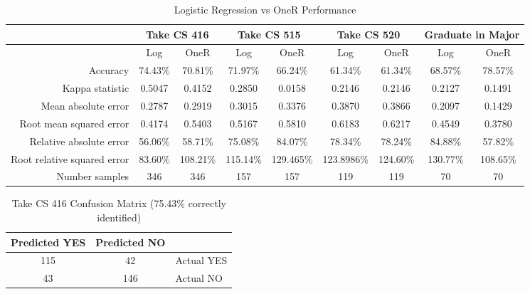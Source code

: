 \documentclass[letterpaper,11pt]{article}
\begin{document}
\begin{table}[h!]
\begin{center}
\tiny
  \begin{tabular}{r|c|c|c|c|c|c|c|c|}
          & \multicolumn{2}{|c|}{Take CS 416}& \multicolumn{2}{|c|}{Take CS 515}& \multicolumn{2}{|c|}{Take CS 520}& \multicolumn{2}{|c|}{Graduate in Major} \\ \hline
                              & Log     & OneR    & Log     & OneR      & Log        & OneR     & Log        & OneR\\ \hline
Accuracy                      & 74.43\% & 70.81\% & 71.97\% & 66.24\%   & 61.34\%    & 61.34\%  & 68.57\%    & 78.57\% \\
Kappa statistic               & 0.5047  & 0.4152  & 0.2850  & 0.0158    & 0.2146     & 0.2146   & 0.2127     & 0.1491 \\
Mean absolute error           & 0.2787  & 0.2919  & 0.3015  & 0.3376    & 0.3870     & 0.3866   & 0.2097     & 0.1429 \\
Root mean squared error       & 0.4174  & 0.5403  & 0.5167  & 0.5810    & 0.6183     & 0.6217   & 0.4549     & 0.3780 \\
Relative absolute error       & 56.06\% & 58.71\% & 75.08\% & 84.07\%   & 78.34\%    & 78.24\%  & 84.88\%    & 57.82\% \\
Root relative squared error   & 83.60\% & 108.21\%& 115.14\%& 129.465\% & 123.8986\% & 124.60\% & 130.77\%   & 108.65\% \\
Number samples                & 346     & 346     & 157     & 157       & 119        & 119      & 70         & 70 \\
  \end{tabular}
\end{center}
  \caption {Logistic Regression vs OneR Performance}
\label{table:logperform}
\end{table}

\begin{table}[h!]
\begin{center}
  \begin{tabular}{ c | c | l }
Predicted YES & Predicted NO & \\ \hline
115  & 42   & Actual YES \\
43   & 146  & Actual NO \\
  \end{tabular}
\end{center}
  \caption {Take CS 416 Confusion Matrix (75.43\% correctly identified)}
\label{table:416confusion}
\end{table}
\end{document}
